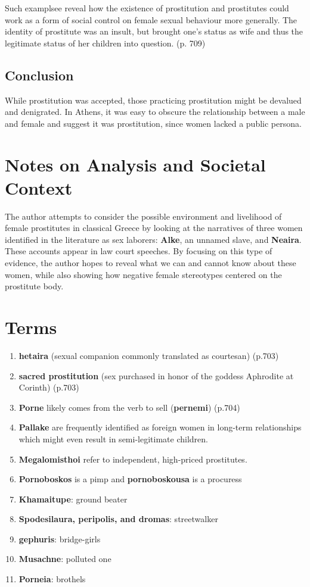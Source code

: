 Such examplsee reveal how the existence of prostitution and prostitutes could work as a form of social control on female sexual behaviour more generally. The identity of prostitute was an insult, but brought one's status as wife and thus the legitimate status of her children into question. (p. 709)


\subsection{Conclusion}

While prostitution was accepted, those practicing prostitution might be devalued and denigrated. In Athens, it was easy to obscure the relationship between a male and female and suggest it was prostitution, since women lacked a public persona.


\section{Notes on Analysis and Societal Context}
\label{sec:SocCont17}

The author attempts to consider the possible environment and livelihood of female prostitutes in classical Greece by looking at the narratives of three women identified in the literature as sex laborers: \textbf{Alke}, an unnamed slave, and \textbf{Neaira}. These accounts appear in law court speeches. By focusing on this type of evidence, the author hopes to reveal what we can and cannot know about these women, while also showing how negative female stereotypes centered on the prostitute body.


\section{Terms}
\label{sec:terms17}

\begin{enumerate}
    \item \textbf{hetaira} (sexual companion commonly translated as courtesan) (p.703)
    \item \textbf{sacred prostitution} (sex purchased in honor of the goddess Aphrodite at Corinth) (p.703)
    \item \textbf{Porne} likely comes from the verb to sell (\textbf{pernemi}) (p.704) 
    \item \textbf{Pallake} are frequently identified as foreign women in long-term relationships which might even result in semi-legitimate children.
    \item \textbf{Megalomisthoi} refer to independent, high-priced prostitutes.
    \item \textbf{Pornoboskos} is a pimp and \textbf{pornoboskousa} is a procuress
    \item \textbf{Khamaitupe}: ground beater
    \item \textbf{Spodesilaura, peripolis, and dromas}: streetwalker
    \item \textbf{gephuris}: bridge-girls
    \item \textbf{Musachne}: polluted one
    \item \textbf{Porneia}: brothels 
\end{enumerate}


